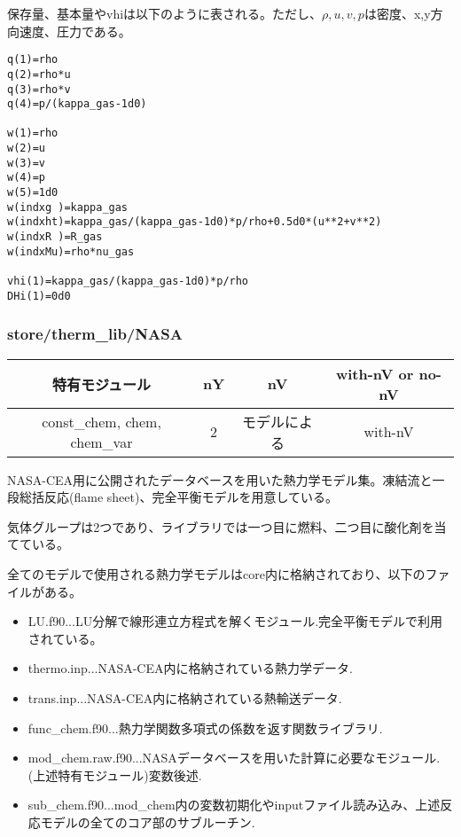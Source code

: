 \documentclass{jsarticle}
\begin{document}
保存量、基本量やvhiは以下のように表される。ただし、$\rho,u,v,p$は密度、x,y方向速度、圧力である。
\begin{verbatim}
q(1)=rho
q(2)=rho*u
q(3)=rho*v
q(4)=p/(kappa_gas-1d0)

w(1)=rho
w(2)=u
w(3)=v
w(4)=p
w(5)=1d0
w(indxg )=kappa_gas
w(indxht)=kappa_gas/(kappa_gas-1d0)*p/rho+0.5d0*(u**2+v**2)
w(indxR )=R_gas
w(indxMu)=rho*nu_gas

vhi(1)=kappa_gas/(kappa_gas-1d0)*p/rho
DHi(1)=0d0
\end{verbatim}
\subsubsection{store/therm\_lib/NASA}%
\begin{center}
\begin{tabular}{cccc}\hline
特有モジュール               & nY &            nV & with-nV or no-nV\\\hline \hline
const\_chem, chem, chem\_var &  2 &  モデルによる & with-nV\\
\hline
\end{tabular}
\end{center}

NASA-CEA用に公開されたデータベースを用いた熱力学モデル集。凍結流と一段総括反応(flame sheet)、完全平衡モデルを用意している。

気体グループは2つであり、ライブラリでは一つ目に燃料、二つ目に酸化剤を当てている。

全てのモデルで使用される熱力学モデルはcore内に格納されており、以下のファイルがある。
\begin{itemize}
\item LU.f90...LU分解で線形連立方程式を解くモジュール.完全平衡モデルで利用されている。
\item thermo.inp...NASA-CEA内に格納されている熱力学データ.
\item trans.inp...NASA-CEA内に格納されている熱輸送データ.
\item func\_chem.f90...熱力学関数多項式の係数を返す関数ライブラリ.
\item mod\_chem.raw.f90...NASAデータベースを用いた計算に必要なモジュール.(上述特有モジュール)変数後述.
\item sub\_chem.f90...mod\_chem内の変数初期化やinputファイル読み込み、上述反応モデルの全てのコア部のサブルーチン.
\end{itemize}
\end{document}
